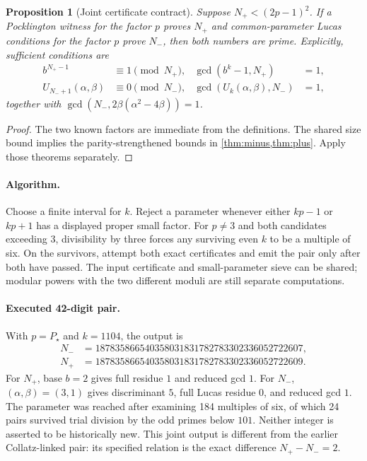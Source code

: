 \documentclass[11pt,a4paper]{article}
\newtheorem{proposition}[theorem]{Proposition}
\theoremstyle{definition}\newtheorem{definition}[theorem]{Definition}
\theoremstyle{remark}\newtheorem{remark}[theorem]{Remark}
\begin{document}
\begin{proposition}[Joint certificate contract]\label{prop:a03}
Suppose $N_+<(2p-1)^2$. If a Pocklington witness for the factor $p$ proves
$N_+$ and common-parameter Lucas conditions for the factor $p$ prove $N_-$,
then both numbers are prime. Explicitly, sufficient conditions are
\begin{align*}
 b^{N_+-1}&\equiv1\pmod{N_+},&
 \gcd(b^k-1,N_+)&=1,\\
 U_{N_-+1}(\alpha,\beta)&\equiv0\pmod{N_-},&
 \gcd(U_k(\alpha,\beta),N_-)&=1,
\end{align*}
together with $\gcd(N_-,2\beta(\alpha^2-4\beta))=1$.
\end{proposition}
\begin{proof}
The two known factors are immediate from the definitions. The shared size
bound implies the parity-strengthened bounds in
\cref{thm:minus,thm:plus}. Apply those theorems separately.
\end{proof}

\paragraph{Algorithm.}
Choose a finite interval for $k$. Reject a parameter whenever either
$kp-1$ or $kp+1$ has a displayed proper small factor. For $p\ne3$ and
both candidates exceeding $3$, divisibility by three forces any surviving
even $k$ to be a multiple of six. On the survivors, attempt both exact
certificates and emit the pair only after both have passed. The input
certificate and small-parameter sieve can be shared; modular powers with
the two different moduli are still separate computations.

\paragraph{Executed 42-digit pair.}
With $p=P_\star$ and $k=1104$, the output is
\begin{align*}
 N_-&=187835866540358031831782783302336052722607,\\
 N_+&=187835866540358031831782783302336052722609.
\end{align*}
For $N_+$, base $b=2$ gives full residue $1$ and reduced gcd $1$.
For $N_-$, $(\alpha,\beta)=(3,1)$ gives discriminant $5$, full Lucas
residue $0$, and reduced gcd $1$. The parameter was reached after examining
184 multiples of six, of which 24 pairs survived trial division by the
odd primes below $101$. Neither integer is asserted to be historically new.
This joint output is different from the earlier Collatz-linked pair: its
specified relation is the exact difference $N_+-N_-=2$.
\end{document}
